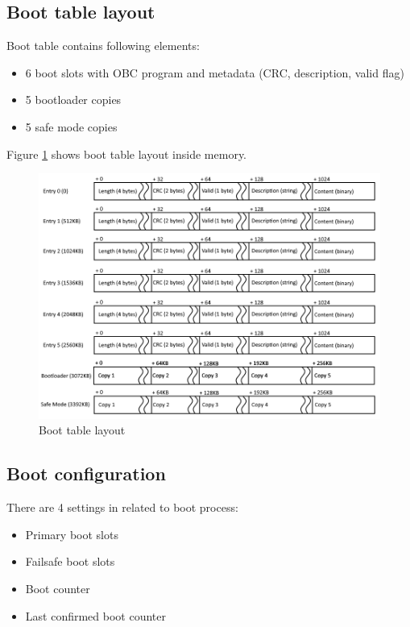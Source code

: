 \subsection{Boot table layout}
Boot table contains following elements:
\begin{itemize}
	\item 6 boot slots with OBC program and metadata (CRC, description, valid flag)
	\item 5 bootloader copies
	\item 5 safe mode copies
\end{itemize}

Figure \ref{fig:func:boottable} shows boot table layout inside memory.

\begin{figure}
	\includegraphics[width=20cm,angle=90]{img/boot-table.png}
	\caption{Boot table layout}
	\label{fig:func:boottable}
\end{figure}

\subsection{Boot configuration}
There are 4 settings in  related to boot process:
\begin{itemize}
	\item Primary boot slots
	\item Failsafe boot slots
	\item Boot counter
	\item Last confirmed boot counter
\end{itemize}

